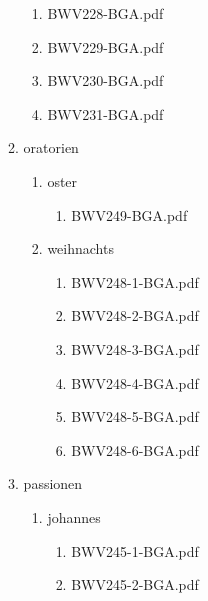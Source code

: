\documentclass[11pt]{article}
\begin{document}
\begin{enumerate}
\begin{enumerate}
\begin{enumerate}
\item BWV228-BGA.pdf
\label{sec-1-1-1-1-44-6-7-7-4}

\item BWV229-BGA.pdf
\label{sec-1-1-1-1-44-6-7-7-5}

\item BWV230-BGA.pdf
\label{sec-1-1-1-1-44-6-7-7-6}

\item BWV231-BGA.pdf
\label{sec-1-1-1-1-44-6-7-7-7}
\end{enumerate}

\item oratorien
\label{sec-1-1-1-1-44-6-7-8}
\begin{enumerate}
\item oster
\label{sec-1-1-1-1-44-6-7-8-1}
\begin{enumerate}
\item BWV249-BGA.pdf
\label{sec-1-1-1-1-44-6-7-8-1-1}
\end{enumerate}

\item weihnachts
\label{sec-1-1-1-1-44-6-7-8-2}
\begin{enumerate}
\item BWV248-1-BGA.pdf
\label{sec-1-1-1-1-44-6-7-8-2-1}

\item BWV248-2-BGA.pdf
\label{sec-1-1-1-1-44-6-7-8-2-2}

\item BWV248-3-BGA.pdf
\label{sec-1-1-1-1-44-6-7-8-2-3}

\item BWV248-4-BGA.pdf
\label{sec-1-1-1-1-44-6-7-8-2-4}

\item BWV248-5-BGA.pdf
\label{sec-1-1-1-1-44-6-7-8-2-5}

\item BWV248-6-BGA.pdf
\label{sec-1-1-1-1-44-6-7-8-2-6}
\end{enumerate}
\end{enumerate}

\item passionen
\label{sec-1-1-1-1-44-6-7-9}
\begin{enumerate}
\item johannes
\label{sec-1-1-1-1-44-6-7-9-1}
\begin{enumerate}
\item BWV245-1-BGA.pdf
\label{sec-1-1-1-1-44-6-7-9-1-1}

\item BWV245-2-BGA.pdf
\label{sec-1-1-1-1-44-6-7-9-1-2}


\end{enumerate}
\end{enumerate}
\end{enumerate}
\end{enumerate}
\end{document}
